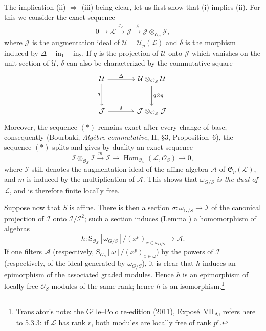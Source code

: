The implication (ii) \(\Rightarrow\) (iii) being clear, let us first show
that (i) implies (ii). For this we consider the exact sequence
\begin{equation}
  0\longrightarrow\mathcal L
  \xrightarrow{j_{\mathcal L}}\mathcal J
  \xrightarrow{\delta}\mathcal J\otimes_{\mathcal O_S}\mathcal J,
  \tag{\(*\)}
\end{equation}
where \(\mathcal J\) is the augmentation ideal of
\(\mathcal U=\mathcal U_p(\mathcal L)\) and \(\delta\) is the morphism
induced by \(\Delta-\mathrm{in}_1-\mathrm{in}_2\). If \(q\) is the
projection of \(\mathcal U\) onto \(\mathcal J\) which vanishes on the
unit section of \(\mathcal U\), \(\delta\) can also be characterized by
the commutative square
\[
\begin{tikzcd}[row sep=2.8em,column sep=3.6em]
  \mathcal U \arrow[r,"\Delta"] \arrow[d,swap,"q"]
  & \mathcal U\otimes_{\mathcal O_S}\mathcal U \arrow[d,"q\otimes q"] \\
  \mathcal J \arrow[r,"\delta"]
  & \mathcal J\otimes_{\mathcal O_S}\mathcal J
\end{tikzcd}
\]
Moreover, the sequence \((*)\) remains exact after every change of base;
consequently (Bourbaki, \emph{Alg\`ebre commutative}, II, \S3,
Proposition~6), the sequence \((*)\) splits and gives by duality an exact
sequence
\[
  \mathcal I\otimes_{\mathcal O_S}\mathcal I
  \xrightarrow{m}
  \mathcal I
  \longrightarrow
  \operatorname{Hom}_{\mathcal O_S}(\mathcal L,\mathcal O_S)
  \longrightarrow0,
\]
where \(\mathcal I\) still denotes the augmentation ideal of the affine
algebra \(\mathcal A\) of \(\mathfrak G_p(\mathcal L)\), and \(m\) is
induced by the multiplication of \(\mathcal A\). This shows that
\(\omega_{G/S}\) \emph{is the dual of} \(\mathcal L\), and is therefore
finite locally free.

Suppose now that \(S\) is affine. There is then a section
\(\sigma:\omega_{G/S}\to\mathcal I\) of the canonical projection of
\(\mathcal I\) onto \(\mathcal I/\mathcal I^2\); such a section induces
(Lemma ) a homomorphism of algebras
\[
  h:\mathrm S_{\mathcal O_S}[\omega_{G/S}]/(x^p)_{x\in\omega_{G/S}}
  \longrightarrow\mathcal A.
\]
If one filters \(\mathcal A\) (respectively,
\(\mathrm S_{\mathcal O_S}[\omega]/(x^p)_{x\in\omega}\)) by the powers of
\(\mathcal I\) (respectively, of the ideal generated by
\(\omega_{G/S}\)), it is clear that \(h\) induces an epimorphism of the
associated graded modules. Hence \(h\) is an epimorphism of locally free
\(\mathcal O_S\)-modules of the same rank; hence \(h\) is an
isomorphism.\footnote{Translator's note: the Gille--Polo re-edition
(2011), Expos\'e~VII\textsubscript{A}, refers here to 5.3.3: if
\(\mathcal L\) has rank \(r\), both modules are locally free of rank
\(p^r\).}

